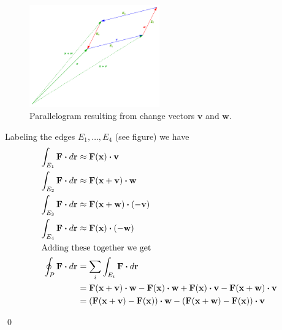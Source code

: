 \documentclass[letterpaper, 11pt, openany]{book}
\newcommand{\scdot}{\boldsymbol{\cdot}}
\theoremstyle{mytheoremstyle}
\renewenvironment{proof}{{\par \sffamily \smaller \fontseries{b}\selectfont Proof}}{\hfill\qed}
\theoremstyle{myexamplestyle}
\begin{document}
\begin{proof}
    \begin{figure}[htbp]
        \centering
            \includegraphics[width=0.5\textwidth]{Figures/greens-vectors.pdf}
        \caption{Parallelogram resulting from change vectors \(\mathbf{v}\) and \(\mathbf{w}\).}
        \label{<label>}
    \end{figure}

    Labeling the edges \(E_{1}, \ldots , E_{4}\) (see figure) we have
    \begin{align*}
        \int_{E_{1}} \mathbf{F}\scdot d\mathbf{r} & \approx \mathbf{F}(\mathbf{x})\scdot \mathbf{v}\\
        \int_{E_{2}} \mathbf{F}\scdot d\mathbf{r} & \approx \mathbf{F}(\mathbf{x} + \mathbf{v})\scdot \mathbf{w}\\
        \int_{E_{3}} \mathbf{F}\scdot d\mathbf{r} & \approx \mathbf{F}(\mathbf{x} + \mathbf{w})\scdot (-\mathbf{v})\\
        \int_{E_{4}} \mathbf{F}\scdot d\mathbf{r} & \approx \mathbf{F}(\mathbf{x})\scdot (-\mathbf{w})\\
        \intertext{Adding these together we get}
        \oint_{P} \mathbf{F}\scdot d\mathbf{r}  &= \sum_{i} \int_{E_{i}} \mathbf{F}\scdot d\mathbf{r}\\
                                                &= \mathbf{F}(\mathbf{x} + \mathbf{v})\scdot \mathbf{w} - \mathbf{F}(\mathbf{x})\scdot \mathbf{w} + \mathbf{F}(\mathbf{x})\scdot \mathbf{v} - \mathbf{F}(\mathbf{x} + \mathbf{w})\scdot \mathbf{v}\\
                                                &=(\mathbf{F}(\mathbf{x} + \mathbf{v}) - \mathbf{F}(\mathbf{x}))\scdot \mathbf{w} - (\mathbf{F}(\mathbf{x} + \mathbf{w}) - \mathbf{F}(\mathbf{x}))\scdot \mathbf{v}
    \end{align*}
    

\end{proof}
\end{document}
